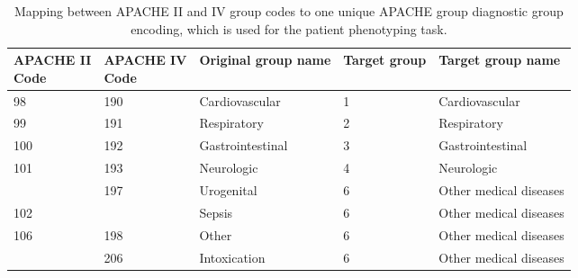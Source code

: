 \documentclass{article}
\begin{document}
\begin{table}[ht!]
\caption{Mapping between APACHE II and IV group codes to one 
         unique APACHE group diagnostic group encoding, which is used for 
         the patient phenotyping task.}
\label{tab:appendix-apache-map-table}
{\selectfont\small
\begin{tabular}{lllll}
\toprule
\makecell{\textbf{APACHE II} \\ \textbf{Code}} & \makecell{\textbf{APACHE IV} \\ \textbf{Code}} & \textbf{Original group name}                                           & \textbf{Target group} & \textbf{Target group name}                              \\
\midrule
98                         & 190                        & Cardiovascular                                          & 1                     & {\color[HTML]{333333} Cardiovascular}                   \\
99                         & 191                        & Respiratory                                             & 2                     & Respiratory                                             \\
100                        & 192                        & Gastrointestinal                                        & 3                     & Gastrointestinal                                        \\
101                        & 193                        & Neurologic                                              & 4                     & Neurologic                                              \\
                           & 197                        & Urogenital                                              & 6                     & Other medical diseases                                  \\
102                        &                            & Sepsis                                                  & 6                     & Other medical diseases                                  \\
106                        & 198                        & Other                                                   & 6                     & Other medical diseases                                  \\
                           & 206                        & Intoxication                                            & 6                     & Other medical diseases                                  \\

\end{tabular}}
\end{table}
\end{document}
